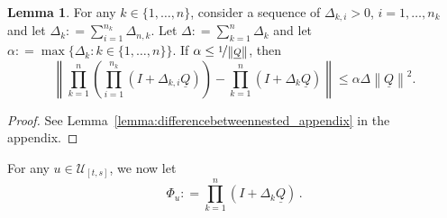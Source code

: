 \documentclass[10pt]{paper}
\theoremstyle{definition}
\newtheorem{lemma}[theorem]{Lemma}
\newcommand{\lrate}{\underline{Q}}
\newcommand{\norm}[1]{\left\lVert #1 \right\rVert}
\newcommand{\coloneqq}{:\!=}
\begin{document}
\begin{lemma}\label{lemma:differencebetweennested}
For any $k\in\{1,\dots,n\}$, consider a sequence of $\Delta_{k,i}>0$, $i=1,\dots,n_k$ and let $\Delta_k\coloneqq\sum_{i=1}^{n_k}\Delta_{n,k}$. Let $\Delta\coloneqq\sum_{k=1}^n\Delta_k$ and let $\alpha\coloneqq\max\{\Delta_k\colon k\in\{1,\dots,n\}\}$. If $\alpha\leq\nicefrac{1}{\norm{\lrate}}$, then
\begin{equation*}
\norm{\prod_{k=1}^n\left(\prod_{i=1}^{n_k}(I+\Delta_{k,i}\lrate)\right)
-
\prod_{k=1}^n(I+\Delta_k\lrate)
}
\leq\alpha\Delta\norm{\lrate}^2.
\end{equation*}
\end{lemma}
\begin{proof}
See Lemma~\ref{lemma:differencebetweennested_appendix} in the appendix.
\end{proof}

\noindent For any $u\in\mathcal{U}_{[t,s]}$, we now let
\begin{equation*}
\Phi_u\coloneqq\prod_{k=1}^n(I+\Delta_k\lrate)\,.
\end{equation*}
\end{document}
